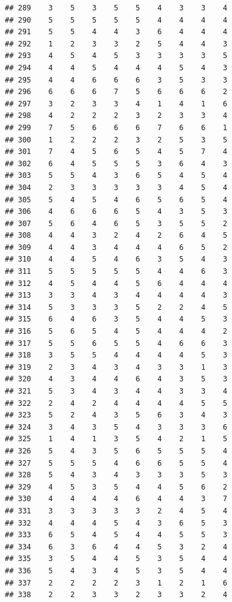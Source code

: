 \documentclass[
]{article}
\begin{document}
\begin{verbatim}
## 289    3    5    3    5    5    4    3    3    4
## 290    5    5    5    5    5    4    4    4    4
## 291    5    5    4    4    3    6    4    4    4
## 292    1    2    3    3    2    5    4    4    3
## 293    4    5    4    5    3    3    3    3    5
## 294    4    4    5    4    4    4    5    4    3
## 295    4    4    6    6    6    3    5    3    3
## 296    6    6    6    7    5    6    6    6    2
## 297    3    2    3    3    4    1    4    1    6
## 298    4    2    2    2    3    2    3    3    4
## 299    7    5    6    6    6    7    6    6    1
## 300    1    2    2    2    3    2    5    3    5
## 301    7    4    5    6    5    4    5    7    4
## 302    6    4    5    5    5    3    6    4    3
## 303    5    5    4    3    6    5    4    5    4
## 304    2    3    3    3    3    3    4    5    4
## 305    5    4    5    4    6    5    6    5    4
## 306    4    6    6    6    5    4    3    5    3
## 307    5    6    4    6    5    3    5    5    2
## 308    4    4    3    2    4    2    6    4    5
## 309    4    4    3    4    4    4    6    5    2
## 310    4    4    5    4    6    3    5    4    3
## 311    5    5    5    5    5    4    4    6    3
## 312    4    5    4    4    5    6    4    4    4
## 313    3    3    4    3    4    4    4    4    3
## 314    5    3    3    3    5    2    2    4    5
## 315    6    4    6    3    5    4    4    5    3
## 316    5    6    5    4    5    4    4    4    2
## 317    5    5    6    5    5    4    6    6    3
## 318    3    5    5    4    4    4    4    5    3
## 319    2    3    4    3    4    3    3    1    3
## 320    4    3    4    4    6    4    3    5    3
## 321    5    3    4    3    4    4    3    3    4
## 322    2    4    2    4    4    4    4    5    5
## 323    5    2    4    3    5    6    3    4    3
## 324    3    4    3    5    4    3    3    3    6
## 325    1    4    1    3    5    4    2    1    5
## 326    5    4    3    5    6    5    5    5    4
## 327    5    5    5    4    6    6    5    5    4
## 328    5    4    3    4    3    3    3    5    3
## 329    4    5    3    5    4    4    5    6    2
## 330    4    4    4    4    6    4    4    3    7
## 331    3    3    3    3    3    2    4    5    4
## 332    4    4    4    5    4    3    6    5    3
## 333    6    5    4    5    4    4    5    5    3
## 334    6    3    6    4    4    5    3    2    4
## 335    3    5    4    4    5    3    5    4    4
## 336    5    4    3    4    5    3    5    4    4
## 337    2    2    2    2    3    1    2    1    6
## 338    2    2    3    3    2    3    3    2    4

\end{verbatim}
\end{document}
